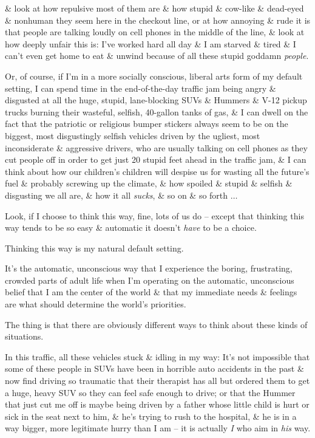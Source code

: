 \documentclass{article}
\begin{document}
\& look at how repulsive most of them are \& how stupid \& cow-like \& dead-eyed \& nonhuman they seem here in the checkout line, or at how annoying \& rude it is that people are talking loudly on cell phones in the middle of the line, \& look at how deeply unfair this is: I've worked hard all day \& I am starved \& tired \& I can't even get home to eat \& unwind because of all these stupid goddamn {\it people}.

Or, of course, if I'm in a more socially conscious, liberal arts form of my default setting, I can spend time in the end-of-the-day traffic jam being angry \& disgusted at all the huge, stupid, lane-blocking SUVs \& Hummers \& V-12 pickup trucks burning their wasteful, selfish, 40-gallon tanks of gas, \& I can dwell on the fact that the patriotic or religious bumper stickers always seem to be on the biggest, most disgustingly selfish vehicles driven by the ugliest, most inconsiderate \& aggressive drivers, who are usually talking on cell phones as they cut people off in order to get just 20 stupid feet ahead in the traffic jam, \& I can think about how our children's children will despise us for wasting all the future's fuel \& probably screwing up the climate, \& how spoiled \& stupid \& selfish \& disgusting we all are, \& how it all {\it sucks}, \& so on \& so forth $\ldots$

Look, if I choose to think this way, fine, lots of us do -- except that thinking this way tends to be so easy \& automatic it doesn't {\it have} to be a choice.

Thinking this way is my natural default setting.

It's the automatic, unconscious way that I experience the boring, frustrating, crowded parts of adult life when I'm operating on the automatic, unconscious belief that I am the center of the world \& that my immediate needs \& feelings are what should determine the world's priorities.

The thing is that there are obviously different ways to think about these kinds of situations.

In this traffic, all these vehicles stuck \& idling in my way: It's not impossible that some of these people in SUVs have been in horrible auto accidents in the past \& now find driving so traumatic that their therapist has all but ordered them to get a huge, heavy SUV so they can feel safe enough to drive; or that the Hummer that just cut me off is maybe being driven by a father whose little child is hurt or sick in the seat next to him, \& he's trying to rush to the hospital, \& he is in a way bigger, more legitimate hurry than I am -- it is actually {\it I} who aim in {\it his} way.
\end{document}
